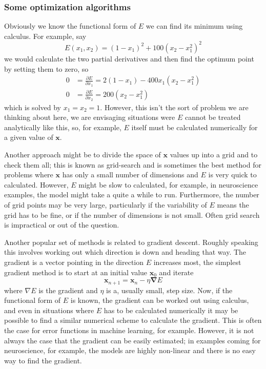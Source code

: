 \documentclass[11pt,a4paper]{scrartcl}
\begin{document}
\subsubsection*{Some optimization algorithms}

Obviously we know the functional form of $E$ we can find its minimum
using calculus. For example, say
\begin{equation}
E(x_1,x_2)=(1-x_1)^2+100(x_2-x_1^2)^2
\end{equation}
we would calculate the two partial derivatives and then find the
optimum point by setting them to zero, so
\begin{equation}
\begin{aligned}
0&=\frac{\partial E}{\partial x_1}=2(1-x_1)-400x_1(x_2-x_1^2)\\
0&=\frac{\partial E}{\partial x_2}=200(x_2-x_1^2)
\end{aligned}
\end{equation}
which is solved by $x_1=x_2=1$. However, this isn't the sort of
problem we are thinking about here, we are envisaging situations were
$E$ cannot be treated analytically like this, so, for example, $E$
itself must be calculated numerically for a given value of
$\mathbf{x}$.

Another approach might be to divide the space of $\mathbf{x}$ values
up into a grid and to check them all; this is known as grid-search and
is sometimes the best method for problems where $\mathbf{x}$ has only
a small number of dimensions and $E$ is very quick to
calculated. However, $E$ might be slow to calculated, for example, in
neuroscience examples, the model might take a quite a while to
run. Furthermore, the number of grid points may be very large,
particularly if the variability of $E$ means the grid has to be fine,
or if the number of dimensions is not small. Often grid search is
impractical or out of the question.

Another popular set of methods is related to gradient descent. Roughly
speaking this involves working out which direction is down and heading
that way. The gradient is a vector pointing in the direction $E$
increases most, the simplest gradient method is to start at an initial
value $\mathbf{x}_0$ and iterate
\begin{equation}
\mathbf{x}_{n+1}=\mathbf{x}_n-\eta \mathbf{\nabla}E
\end{equation}
where ${\nabla}E$ is the gradient and $\eta$ is a, usually small, step
size. Now, if the functional form of $E$ is known, the gradient can be
worked out using calculus, and even in situations where $E$ has to be
calculated numerically it may be possible to find a similar numerical
scheme to calculate the gradient. This is often the case for error
functions in machine learning, for example. However, it is not always
the case that the gradient can be easily estimated; in examples coming
for neuroscience, for example, the models are highly non-linear and
there is no easy way to find the gradient.
\end{document}
